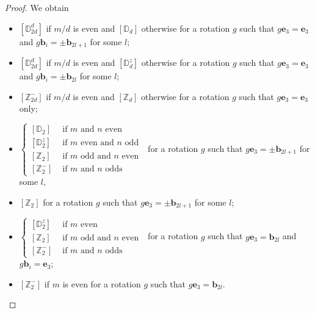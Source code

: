 \documentclass[11pt,a4paper]{amsart}
\theoremstyle{definition}
\newcommand{\ZZ}{\mathbb{Z}}                %
\newcommand{\DD}{\mathbb{D}}                %
\newcommand{\1}{\mathds{1}}		            %
\newcommand{\ee}{\pmb{e}}                   %
\newcommand{\vR}{\mathbf{r}}
\newcommand{\bb}{\mathbf{b}}
\begin{document}
\begin{proof}
	We obtain
	\begin{itemize}
		\item $[\DD_{2d}^d]$ if $m/d$ is even and $[\DD_d]$ otherwise for a rotation $g$ such that $g\ee_3=\ee_3$ and $g\bb_i=\pm\bb_{2l+1}$ for some $l$;\\
		\item $[\DD_{2d}^d]$ if $m/d$ is even and $[\DD_d^z]$ otherwise for a rotation $g$ such that  $g\ee_3= \ee_3$ and $g\bb_i=\pm \bb_{2l}$ for some $l$;\\
		\item $[\ZZ_{2d}^-]$ if $m/d$ is even and $[\ZZ_d]$ otherwise for a rotation $g$ such that $g\ee_3=\ee_3$ only; \\
		 \item $\begin{cases}
		 [\DD_{2}] &\text{ if } m \text{ and } n \text{ even }       \\
		 [\DD_{2}^z] &\text{ if } m \text{ even and } n \text{ odd } \\
		 [\ZZ_{2}] &\text{ if } m \text{ odd and } n \text{ even }   \\
		 [\ZZ_{2}^-] &\text{ if } m \text{ and } n \text{ odds }
		 \end{cases}$ for a rotation $g$ such that $g\ee_3=\pm \bb_{2l+1}$ for some $l$,\\
		  \item $[\ZZ_2]$ for a rotation $g$ such that $g\ee_3=\pm \bb_{2l+1}$ for some $l$;\\
		  \item $\begin{cases}
		  [\DD_{2}^z] &\text{ if } m \text{ even }                  \\
		  [\ZZ_{2}] &\text{ if } m \text{ odd and } n \text{ even } \\
		  [\ZZ_{2}^-] &\text{ if } m \text{ and } n \text{ odds }
		  \end{cases}$ for a rotation $g$ such that $g\ee_3=\bb_{2l}$ and $g\bb_i=\ee_3$;\\
		  \item $[\ZZ_2^-]$ if $m$ is even for a rotation $g$ such that $g\ee_3=\bb_{2l}$.
	\end{itemize}
\end{proof}
\end{document}
